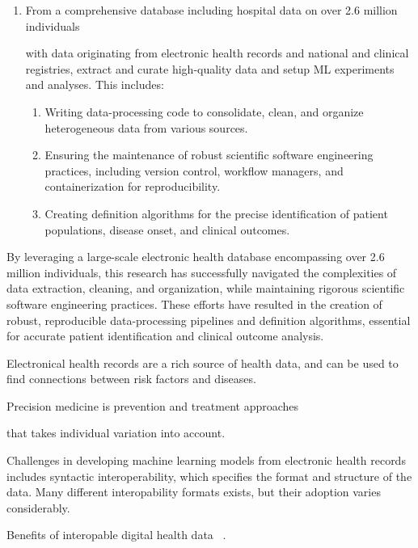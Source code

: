\begin{enumerate}
    \item 
        From a comprehensive database including 
        hospital data on over \num{2.6} million individuals 

        with data 
        originating from electronic health records and
        national and clinical registries, extract and curate 
        high-quality data and setup \ac{ML} experiments and analyses.
        This includes:
    \begin{enumerate}
        \item Writing data-processing code to 
            consolidate, clean, and organize heterogeneous
            data from various sources.
        \item Ensuring the maintenance of robust scientific software 
            engineering practices, including version control, workflow
            managers, and containerization for reproducibility.
        \item Creating definition algorithms for the precise identification of 
            patient populations, disease onset, and clinical outcomes.
    \end{enumerate}
\end{enumerate}

By leveraging a large-scale electronic health database encompassing over
\num{2.6} million individuals, this research has successfully navigated the
complexities of data extraction, cleaning, and organization, while maintaining
rigorous scientific software engineering practices. These efforts have resulted
in the creation of robust, reproducible data-processing pipelines and
definition algorithms, essential for accurate patient identification and
clinical outcome analysis.

Electronical health records are a rich source of health data,
and can be used to find connections between risk factors and diseases.

Precision medicine is prevention and treatment approaches

that takes individual variation into account.


Challenges in developing machine learning models from electronic health records
includes syntactic interoperability, 
which specifies the format and structure of the data.
Many different interopability formats exists, 
but their adoption varies considerably.

Benefits of interopable digital health data
~\autocite{lehneWhy2019}.

